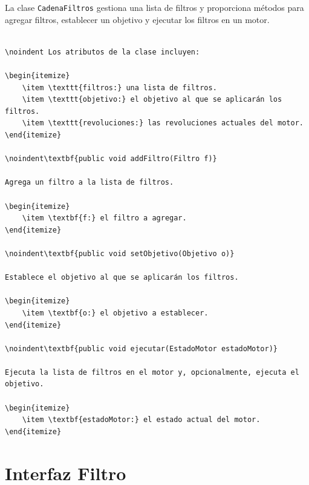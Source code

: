 \documentclass{article}
\begin{document}
La clase \texttt{CadenaFiltros} gestiona una lista de filtros y proporciona métodos para agregar filtros, establecer un objetivo y ejecutar los filtros en un motor.

\begin{lstlisting}

\noindent Los atributos de la clase incluyen:

\begin{itemize}
    \item \texttt{filtros:} una lista de filtros.
    \item \texttt{objetivo:} el objetivo al que se aplicarán los filtros.
    \item \texttt{revoluciones:} las revoluciones actuales del motor.
\end{itemize}

\noindent\textbf{public void addFiltro(Filtro f)}

Agrega un filtro a la lista de filtros.

\begin{itemize}
    \item \textbf{f:} el filtro a agregar.
\end{itemize}

\noindent\textbf{public void setObjetivo(Objetivo o)}

Establece el objetivo al que se aplicarán los filtros.

\begin{itemize}
    \item \textbf{o:} el objetivo a establecer.
\end{itemize}

\noindent\textbf{public void ejecutar(EstadoMotor estadoMotor)}

Ejecuta la lista de filtros en el motor y, opcionalmente, ejecuta el objetivo.

\begin{itemize}
    \item \textbf{estadoMotor:} el estado actual del motor.
\end{itemize}

\end{lstlisting}


\section{Interfaz Filtro}
\end{document}
